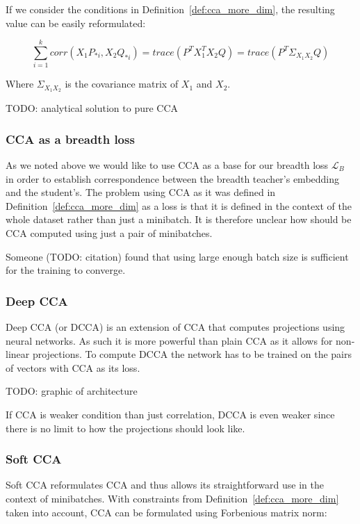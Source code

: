 If we consider the conditions in Definition~\ref{def:cca_more_dim}, the
resulting value can be easily reformulated:

\begin{equation}
    \sum_{i = 1}^k corr(X_1P_{*i}, X_2Q_{*i}) =
    trace(P^TX_1^TX_2Q) =
    trace(P^T\Sigma_{X_1X_2}Q)
\end{equation}

Where $\Sigma_{X_1X_2}$ is the covariance matrix of $X_1$ and $X_2$.

TODO: analytical solution to pure CCA

\subsubsection{CCA as a breadth loss}

As we noted above we would like to use CCA as a base for our breadth loss
$\mathcal{L}_B$ in order to establish correspondence between the breadth
teacher's embedding and the student's. The problem using CCA as it was defined
in Definition~\ref{def:cca_more_dim} as a loss is that it is defined in the
context of the whole dataset rather than just a minibatch. It is therefore
unclear how should be CCA computed using just a pair of minibatches.

Someone (TODO: citation) found that using large enough batch size is sufficient
for the training to converge.

\subsubsection{Deep CCA}

Deep CCA (or DCCA) is an extension of CCA that computes projections using
neural networks. As such it is more powerful than plain CCA as it allows for
non-linear projections. To compute DCCA the network has to be trained on the
pairs of vectors with CCA as its loss.

TODO: graphic of architecture

If CCA is weaker condition than just correlation, DCCA is even weaker since
there is no limit to how the projections should look like.

\subsubsection{Soft CCA}

Soft CCA reformulates CCA and thus allows its straightforward use in the
context of minibatches. With constraints from Definition~\ref{def:cca_more_dim}
taken into account, CCA can be formulated using Forbenious matrix norm:


